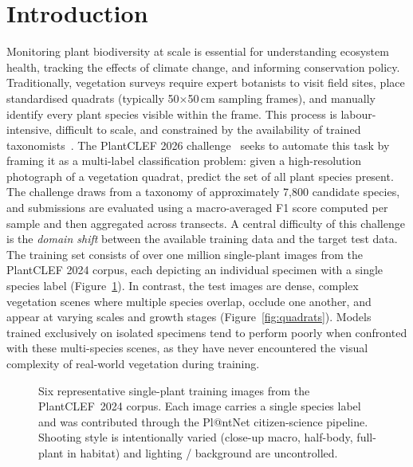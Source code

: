 \documentclass[sigconf]{ceurart}
\begin{document}
\section{Introduction}
\label{sec:introduction}
Monitoring plant biodiversity at scale is essential for understanding ecosystem health, tracking the effects of climate change, and informing conservation policy. Traditionally, vegetation surveys require expert botanists to visit field sites, place standardised quadrats (typically 50$\times$50\,cm sampling frames), and manually identify every plant species visible within the frame. This process is labour-intensive, difficult to scale, and constrained by the availability of trained taxonomists~\cite{joly2024overview}.
The PlantCLEF 2026 challenge~\cite{plantclef2026} seeks to automate this task by framing it as a multi-label classification problem: given a high-resolution photograph of a vegetation quadrat, predict the set of all plant species present. The challenge draws from a taxonomy of approximately 7,800 candidate species, and submissions are evaluated using a macro-averaged F1 score computed per sample and then aggregated across transects.
A central difficulty of this challenge is the \emph{domain shift} between the available training data and the target test data. The training set consists of over one million single-plant images from the PlantCLEF 2024 corpus, each depicting an individual specimen with a single species label (Figure~\ref{fig:train_grid}). In contrast, the test images are dense, complex vegetation scenes where multiple species overlap, occlude one another, and appear at varying scales and growth stages (Figure~\ref{fig:quadrats}). Models trained exclusively on isolated specimens tend to perform poorly when confronted with these multi-species scenes, as they have never encountered the visual complexity of real-world vegetation during training.

\begin{figure}[t]
  \centering
  \resizebox{0.92\linewidth}{!}{}
  \caption{Six representative single-plant training images from the PlantCLEF~2024 corpus. Each image carries a single species label and was contributed through the Pl@ntNet citizen-science pipeline. Shooting style is intentionally varied (close-up macro, half-body, full-plant in habitat) and lighting / background are uncontrolled.}
  \label{fig:train_grid}
\end{figure}
\end{document}
